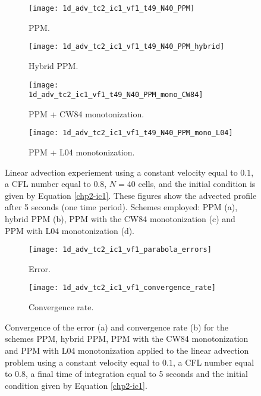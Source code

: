 \newpage
\begin{figure}[!htb]
  \centering
  \begin{subfigure}{0.45\textwidth}
    \centering
			\texttt{[image: 1d\_adv\_tc2\_ic1\_vf1\_t49\_N40\_PPM]}
			\caption{PPM.\label{chp2-sec-exp-adv1-a}}
  \end{subfigure}
  \begin{subfigure}{0.45\textwidth}
    \centering
			\texttt{[image: 1d\_adv\_tc2\_ic1\_vf1\_t49\_N40\_PPM\_hybrid]}
			\caption{Hybrid PPM.\label{chp2-sec-exp-adv1-b}}
  \end{subfigure}

  \begin{subfigure}{0.45\textwidth}
    \centering
		\texttt{[image: 1d\_adv\_tc2\_ic1\_vf1\_t49\_N40\_PPM\_mono\_CW84]}
    \caption{PPM + CW84 monotonization.\label{chp2-sec-exp-adv1-c}}
  \end{subfigure}
  \begin{subfigure}{0.45\textwidth}
    \centering
			\texttt{[image: 1d\_adv\_tc2\_ic1\_vf1\_t49\_N40\_PPM\_mono\_L04]}
      \caption{PPM + L04 monotonization.\label{chp2-sec-exp-adv1-d}}
  \end{subfigure} 
	\caption{Linear advection experiement using a constant velocity equal to $0.1$,
  a CFL number equal to $0.8$, $N=40$ cells, and the initial condition is given by Equation \eqref{chp2-ic1}.
	These figures show the advected profile after 5 seconds (one time period).
	Schemes employed: PPM (a), hybrid PPM (b), PPM with the CW84 monotonization
	(c) and PPM with L04 monotonization (d). \label{chp2-sec-exp-adv1}}
\end{figure}

\begin{figure}[!htb]
  \centering
  \begin{subfigure}{0.45\textwidth}
    \centering
		\texttt{[image: 1d\_adv\_tc2\_ic1\_vf1\_parabola\_errors]}
		\caption{Error.\label{chp2-sec-exp-adv1-error}}
  \end{subfigure}
  \begin{subfigure}{0.45\textwidth}
    \centering
			\texttt{[image: 1d\_adv\_tc2\_ic1\_vf1\_convergence\_rate]}
		\caption{Convergence rate.\label{chp2-sec-exp-adv1-CR}}
  \end{subfigure}
	\caption{Convergence of the error (a) and convergence rate (b) for the schemes
  PPM, hybrid PPM, PPM with the CW84 monotonization and PPM with L04 monotonization
	applied to the linear advection problem using a constant velocity equal to $0.1$,
	a CFL number equal to $0.8$, a final time of integration equal to 5 seconds
	and the initial condition given by Equation \eqref{chp2-ic1}.\label{chp2-sec-exp-adv1-2}}
\end{figure}

